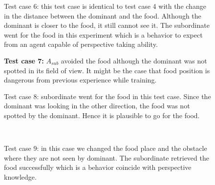 \documentclass{article}
\begin{document}
\begin{figure}[H]
\begin{center}
\caption{Test  case 6: this test case is identical to test case 4 with the change in the distance between the dominant and the food. Although the dominant is closer to the food, it still cannot see it. The subordinate went for the food in this experiment which is a behavior to expect from an agent capable of perspective taking ability.}
\label{fig.tc.4}
\end{center}
\end{figure}



\begin{figure}[H]
\begin{center}
\caption{\textbf {Test  case 7:} \(A_{sub}\) avoided the food although the dominant was not spotted in its field of view. It might be the case that food position is dangerous from previous experience while training.}
\label{fig.tc.6}
\end{center}
\end{figure}
\begin{figure}[H]
\begin{center}
\caption{Test  case 8: subordinate went for the food in this test case. Since the dominant was looking in the other direction, the food was not spotted by the dominant. Hence it is plausible to go for the food.  }
\label{fig.tc.9}
\end{center}
\end{figure}
\begin{figure}[H]
\begin{center}
\\
\caption{Test  case 9: in this case we changed the food place and the obstacle where they are not seen by dominant. The subordinate retrieved the food successfully which is a behavior coincide with perspective knowledge.} 
\label{fig.tc.10}
\end{center}
\end{figure}
\end{document}
